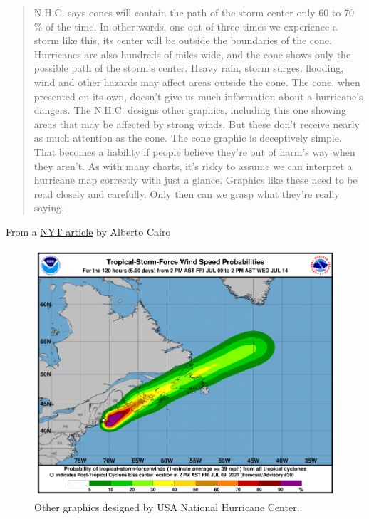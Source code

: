 \documentclass[
]{book}
\newenvironment{rnote}{\par\raggedleft}{\par}
\begin{document}
\begin{quote}
N.H.C. says cones will contain the path of the storm center only 60 to 70 \% of the time. In other words, one out of three times we experience a storm like this, its center will be outside the boundaries of the cone. Hurricanes are also hundreds of miles wide, and the cone shows only the possible path of the storm's center. Heavy rain, storm surges, flooding, wind and other hazards may affect areas outside the cone. The cone, when presented on its own, doesn't give us much information about a hurricane's dangers. The N.H.C. designs other graphics, including this one showing areas that may be affected by strong winds. But these don't receive nearly as much attention as the cone. The cone graphic is deceptively simple. That becomes a liability if people believe they're out of harm's way when they aren't. As with many charts, it's risky to assume we can interpret a hurricane map correctly with just a glance. Graphics like these need to be read closely and carefully. Only then can we grasp what they're really saying.
\end{quote}

\begin{rnote}
From a \href{https://www.nytimes.com/interactive/2019/08/29/opinion/hurricane-dorian-forecast-map.html}{NYT article} by Alberto Cairo

\end{rnote}

\begin{figure}

{\centering \includegraphics[width=0.66\linewidth]{Figures/hurricane-forecast-heat-map} 

}

\caption{Other graphics designed by USA National Hurricane Center.}\label{fig:hurricane-heatmap}
\end{figure}
\end{document}
